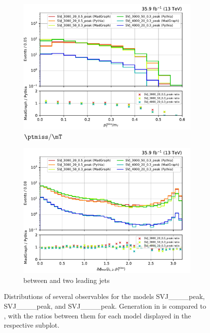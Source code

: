 \begin{figure}[htbp]
    \begin{subfigure}[b]{0.49\textwidth}
        \includegraphics[width=\textwidth]{figures/madgraph_pythia_comparisons/plots/part2/met_over_mt.pdf}
        \caption{$\ptmiss/\mT$}
    \end{subfigure}
    \hfill
    \begin{subfigure}[b]{0.49\textwidth}
        \includegraphics[width=\textwidth]{figures/madgraph_pythia_comparisons/plots/part2/min_dphi.pdf}
        \caption{\mindphi between \ptmiss and two leading \glspl{jet}}
    \end{subfigure}
    \caption[Distributions of several observables for the models SVJ\_\_\_\_\-peak, SVJ\_\_\_\_\-peak, and SVJ\_\_\_\_\-peak]{Distributions of several observables for the models SVJ\_\_\_\_\-peak, SVJ\_\_\_\_\-peak, and SVJ\_\_\_\_\-peak. Generation in \MGvATNLO is compared to \PYTHIAEIGHT, with the ratios between them for each model displayed in the respective subplot.}
    \label{fig:svj_mg_pythia_comparison_set2}
\end{figure}

